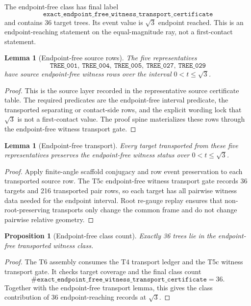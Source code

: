 \documentclass[11pt,a4paper]{article}
\newtheorem{proposition}[theorem]{Proposition}
\newtheorem{lemma}[theorem]{Lemma}
\theoremstyle{definition}
\theoremstyle{remark}
\begin{document}
The endpoint-free class has final label
\[
  \texttt{exact\_endpoint\_free\_witness\_transport\_certificate}
\]
and contains 36 target trees.  Its event value is \(\sqrt{3}\) endpoint reached.  This is an endpoint-reaching statement on the equal-magnitude ray, not a first-contact statement.

\begin{lemma}[Endpoint-free source rows]
The five representatives
\[
  \texttt{TREE\_001},\ \texttt{TREE\_004},\ \texttt{TREE\_005},\ \texttt{TREE\_027},\ \texttt{TREE\_029}
\]
have source endpoint-free witness rows over the interval \(0<t\le\sqrt{3}\).
\end{lemma}

\begin{proof}
This is the source layer recorded in the representative source certificate table.  The required predicates are the endpoint-free interval predicate, the transported separating or contact-side rows, and the explicit wording lock that \(\sqrt{3}\) is not a first-contact value.  The proof spine materializes these rows through the endpoint-free witness transport gate.
\end{proof}

\begin{lemma}[Endpoint-free transport]
Every target transported from these five representatives preserves the endpoint-free witness status over \(0<t\le\sqrt{3}\).
\end{lemma}

\begin{proof}
Apply finite-angle scaffold conjugacy and row event preservation to each transported source row.  The T5c endpoint-free witness transport gate records 36 targets and 216 transported pair rows, so each target has all pairwise witness data needed for the endpoint interval.  Root re-gauge replay ensures that non-root-preserving transports only change the common frame and do not change pairwise relative geometry.
\end{proof}

\begin{proposition}[Endpoint-free class count]
Exactly 36 trees lie in the endpoint-free transported witness class.
\end{proposition}

\begin{proof}
The T6 assembly consumes the T4 transport ledger and the T5c witness transport gate.  It checks target coverage and the final class count
\[
  \#\texttt{exact\_endpoint\_free\_witness\_transport\_certificate}=36.
\]
Together with the endpoint-free transport lemma, this gives the class contribution of 36 endpoint-reaching records at \(\sqrt{3}\).
\end{proof}
\end{document}
